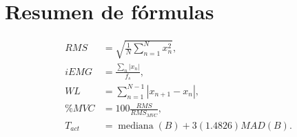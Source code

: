 \documentclass[11pt,spanish]{article}
\begin{document}
\appendix
\section{Resumen de fórmulas}

\begin{align}
RMS &= \sqrt{\frac{1}{N}\sum_{n=1}^{N}x_n^2},\\
iEMG &= \frac{\sum_n |x_n|}{f_s},\\
WL &= \sum_{n=1}^{N-1}|x_{n+1}-x_n|,\\
\%MVC &= 100\frac{RMS}{RMS_{MVC}},\\
T_{act} &= \operatorname{mediana}(B)+3(1.4826)MAD(B).
\end{align}
\end{document}
